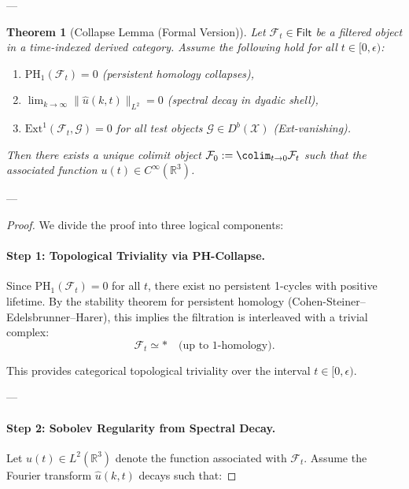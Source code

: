\documentclass[11pt]{article}
\newtheorem{theorem}{Theorem}[section]
\begin{document}
\begin{axiom}
\begin{axiom}
{{---

\begin{theorem}[Collapse Lemma (Formal Version)]
\label{thm:collapse}
Let \( \mathcal{F}_t \in \mathsf{Filt} \) be a filtered object in a time-indexed derived category.  
Assume the following hold for all \( t \in [0, \epsilon) \):

\begin{enumerate}
    \item[(1)] \( \mathrm{PH}_1(\mathcal{F}_t) = 0 \) (persistent homology collapses),
    \item[(2)] \( \lim_{k \to \infty} \| \widehat{u}(k, t) \|_{L^2} = 0 \) (spectral decay in dyadic shell),
    \item[(3)] \( \mathrm{Ext}^1(\mathcal{F}_t, \mathcal{G}) = 0 \) for all test objects \( \mathcal{G} \in D^b(\mathcal{X}) \) (Ext-vanishing).
\end{enumerate}

Then there exists a unique colimit object \( \mathcal{F}_0 := \colim_{t \to 0} \mathcal{F}_t \)  
such that the associated function \( u(t) \in C^\infty(\mathbb{R}^3) \).
\end{theorem}

---

\begin{proof}
We divide the proof into three logical components:

\paragraph{Step 1: Topological Triviality via PH-Collapse.}
Since \( \mathrm{PH}_1(\mathcal{F}_t) = 0 \) for all \( t \),  
there exist no persistent 1-cycles with positive lifetime.  
By the stability theorem for persistent homology (Cohen-Steiner–Edelsbrunner–Harer),  
this implies the filtration is interleaved with a trivial complex:  
\[
\mathcal{F}_t \simeq \ast \quad \text{(up to 1-homology)}.
\]

This provides categorical topological triviality over the interval \( t \in [0, \epsilon) \).

---

\paragraph{Step 2: Sobolev Regularity from Spectral Decay.}
Let \( u(t) \in L^2(\mathbb{R}^3) \) denote the function associated with \( \mathcal{F}_t \).  
Assume the Fourier transform \( \widehat{u}(k, t) \) decays such that:


\end{proof}}}
\end{axiom}
\end{axiom}
\end{document}

